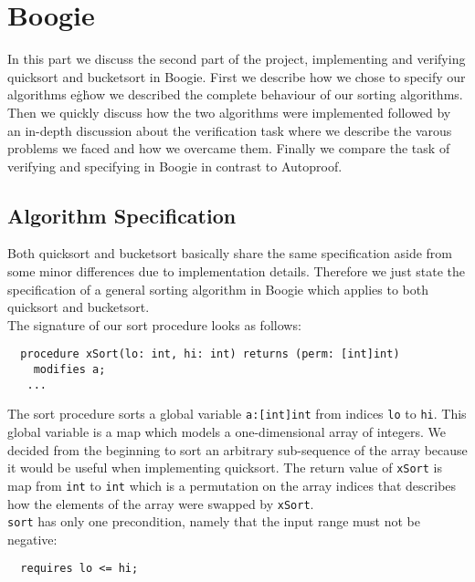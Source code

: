 \section{Boogie}\label{boogie_discussion}

In this part we discuss the second part of the project, implementing and verifying quicksort and bucketsort 
in Boogie. First we describe how we chose to specify our algorithms e\.g\. how we described the complete behaviour
of our sorting algorithms. Then we quickly discuss how the two algorithms were implemented followed by an in-depth 
discussion about the verification task where we describe the varous problems we faced and how we overcame them. Finally
we compare the task of verifying and specifying in Boogie in contrast to Autoproof.

\subsection{Algorithm Specification}

Both quicksort and bucketsort basically share the same specification aside from some minor differences due to 
implementation details. Therefore we just state the specification of a general sorting algorithm in Boogie which 
applies to both quicksort and bucketsort.\\

The signature of our sort procedure looks as follows:

\begin{verbatim}
  procedure xSort(lo: int, hi: int) returns (perm: [int]int)  
    modifies a;
   ...
 \end{verbatim}

The sort procedure sorts a global variable \texttt{a:[int]int} from indices \texttt{lo} to \texttt{hi}.
This global variable is a map which models a one-dimensional array of integers. We decided from the beginning 
to sort an arbitrary sub-sequence of the array because it would be useful when implementing quicksort.
The return value of \texttt{xSort} is map from \texttt{int} to \texttt{int} which is a permutation on the
array indices that describes how the elements of the array were swapped by \texttt{xSort}.
\\

\texttt{sort} has only one precondition, namely that the input range must not be negative:
\begin{verbatim}
  requires lo <= hi;
\end{verbatim}

